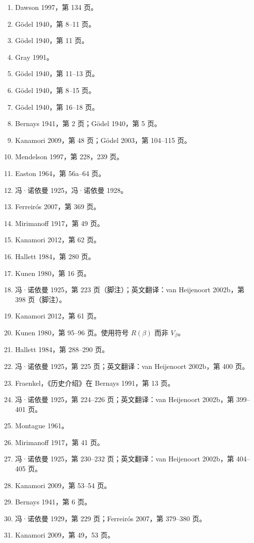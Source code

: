 \begin{enumerate}
\item Dawson 1997，第 134 页。  
\item Gödel 1940，第 8–11 页。  
\item Gödel 1940，第 11 页。  
\item Gray 1991。  
\item Gödel 1940，第 11–13 页。  
\item Gödel 1940，第 8–15 页。  
\item Gödel 1940，第 16–18 页。  
\item Bernays 1941，第 2 页；Gödel 1940，第 5 页。  
\item Kanamori 2009，第 48 页；Gödel 2003，第 104–115 页。  
\item Mendelson 1997，第 228，239 页。  
\item Easton 1964，第 56a–64 页。  
\item 冯·诺依曼 1925，冯·诺依曼 1928。  
\item Ferreirós 2007，第 369 页。  
\item Mirimanoff 1917，第 49 页。  
\item Kanamori 2012，第 62 页。  
\item Hallett 1984，第 280 页。  
\item Kunen 1980，第 16 页。  
\item 冯·诺依曼 1925，第 223 页（脚注）；英文翻译：van Heijenoort 2002b，第 398 页（脚注）。  
\item Kanamori 2012，第 61 页。  
\item Kunen 1980，第 95–96 页。使用符号 \(R(\beta)\) 而非 \(V_\beta\)。  
\item Hallett 1984，第 288–290 页。  
\item 冯·诺依曼 1925，第 225 页；英文翻译：van Heijenoort 2002b，第 400 页。  
\item Fraenkel，《历史介绍》在 Bernays 1991，第 13 页。  
\item 冯·诺依曼 1925，第 224–226 页；英文翻译：van Heijenoort 2002b，第 399–401 页。  
\item Montague 1961。  
\item Mirimanoff 1917，第 41 页。  
\item 冯·诺依曼 1925，第 230–232 页；英文翻译：van Heijenoort 2002b，第 404–405 页。  
\item Kanamori 2009，第 53–54 页。  
\item Bernays 1941，第 6 页。  
\item 冯·诺依曼 1929，第 229 页；Ferreirós 2007，第 379–380 页。  
\item Kanamori 2009，第 49，53 页。  

\end{enumerate}

